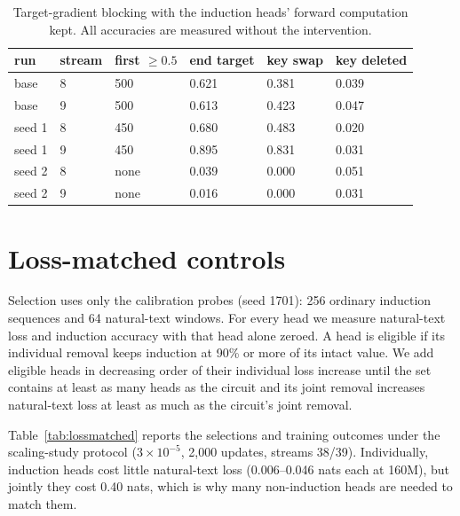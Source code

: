 \begin{table}[!htbp]
\centering\small
\caption{Target-gradient blocking with the induction heads' forward computation
kept. All accuracies are measured without the intervention.}
\label{tab:gradientblock}
\begin{tabular}{llllll}\toprule
run & stream & first $\ge0.5$ & end target & key swap & key deleted \\
\midrule
base & 8 & 500 & 0.621 & 0.381 & 0.039 \\
base & 9 & 500 & 0.613 & 0.423 & 0.047 \\
seed 1 & 8 & 450 & 0.680 & 0.483 & 0.020 \\
seed 1 & 9 & 450 & 0.895 & 0.831 & 0.031 \\
seed 2 & 8 & none & 0.039 & 0.000 & 0.051 \\
seed 2 & 9 & none & 0.016 & 0.000 & 0.031 \\
\bottomrule\end{tabular}
\end{table}

\section{Loss-matched controls}
\label{app:lossmatched}
Selection uses only the calibration probes (seed 1701): 256 ordinary induction
sequences and 64 natural-text windows. For every head we measure natural-text loss
and induction accuracy with that head alone zeroed. A head is eligible if its
individual removal keeps induction at 90\% or more of its intact value. We add
eligible heads in decreasing order of their individual loss increase until the set
contains at least as many heads as the circuit and its joint removal increases
natural-text loss at least as much as the circuit's joint removal.

Table~\ref{tab:lossmatched} reports the selections and training outcomes under the
scaling-study protocol ($3\times10^{-5}$, 2,000 updates, streams 38/39).
Individually, induction heads cost little natural-text loss (0.006--0.046 nats each
at 160M), but jointly they cost 0.40 nats, which is why many non-induction heads
are needed to match them.

